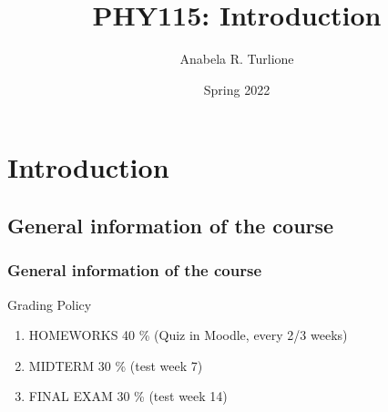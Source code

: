 \documentclass[]{beamer}
\title{PHY115: Introduction}    %
\author{Anabela R. Turlione}                 %
\institute{Digipen}      %
\date{Spring 2022}                    %
\begin{document}
\begin{frame}
  \titlepage
\end{frame}

\section[]{}

\begin{frame}
  \tableofcontents
\end{frame}



\section{Introduction}
\subsection{General information of the course}

\begin{frame}
  \frametitle{General information of the course}
  
Grading Policy %

\vspace{5 mm}

  \begin{enumerate}
      \item HOMEWORKS 40 \% (Quiz in Moodle, every 2/3 weeks)
      \item MIDTERM 30 \% (test week 7)
      \item FINAL EXAM 30 \% (test week 14)
   \end{enumerate}
\end{frame}
\end{document}
